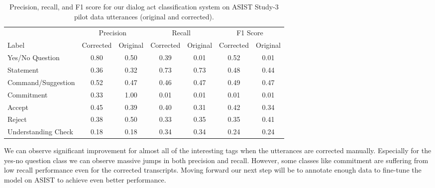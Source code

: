 \begin{table}
    \centering
    \begin{tabular}{l cc cc cc}
        \toprule
                            & \multicolumn{2}{c}{Precision} & \multicolumn{2}{c}{Recall} & \multicolumn{2}{c}{F1 Score}\\
                                \cmidrule(lr){2-3} \cmidrule(lr){4-5} \cmidrule(lr){6-7}
       Label                & Corrected & Original & Corrected & Original & Corrected & Original\\
                             \midrule
        Yes/No Question      & 0.80     & 0.50      & 0.39     & 0.01      & 0.52     & 0.01\\
        Statement            & 0.36     & 0.32      & 0.73     & 0.73      & 0.48     & 0.44\\
        Command/Suggestion   & 0.52     & 0.47      & 0.46     & 0.47      & 0.49     & 0.47\\
        Commitment           & 0.33     & 1.00      & 0.01     & 0.01      & 0.01     & 0.01\\
        Accept               & 0.45     & 0.39      & 0.40     & 0.31      & 0.42     & 0.34\\
        Reject               & 0.38     & 0.50      & 0.33     & 0.35      & 0.35     & 0.41\\
        Understanding Check  & 0.18     & 0.18      & 0.34     & 0.34      & 0.24     & 0.24\\
        \bottomrule
    \end{tabular}
    \caption{%
        Precision, recall, and F1 score for our dialog act classification
        system on ASIST Study-3 pilot data utterances (original and corrected).
    }
    \label{tab:da_results}
\end{table}


We can observe significant improvement for almost all of the interesting tags when the
utterances are corrected manually. Especially for the yes-no question class we can 
observe massive jumps in both precision and recall. However, some classes like commitment
are suffering from low recall performance even for the corrected transcripts. Moving forward
our next step will be to annotate enough data to fine-tune the model on ASIST to achieve
even better performance.
